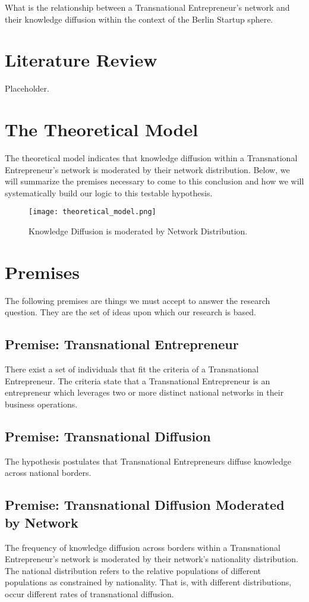 What is the relationship between a Transnational Entrepreneur's
network and their knowledge diffusion within the context of the Berlin
Startup sphere.

\section{Literature Review}
Placeholder.

\section{The Theoretical Model}
The theoretical model indicates that knowledge diffusion within a
Transnational Entrepreneur's network is moderated by their network
distribution. Below, we will summarize the premises necessary to come
to this conclusion and how we will systematically build our logic to
this testable hypothesis.

\begin{figure}[!ht]
  \centering
  \texttt{[image: theoretical\_model.png]}
  \caption{Knowledge Diffusion is moderated by Network Distribution.}
\end{figure}

\section{Premises}
The following premises are things we must accept to answer the
research question. They are the set of ideas upon which our research
is based.

\subsection{Premise: Transnational Entrepreneur}
There exist a set of individuals that fit the criteria of a
Transnational Entrepreneur. The criteria state that a Transnational
Entrepreneur is an entrepreneur which leverages two or more distinct
national networks in their business operations.

\subsection{Premise: Transnational Diffusion}
The hypothesis postulates that Transnational Entrepreneurs diffuse
knowledge across national borders.

\subsection{Premise: Transnational Diffusion Moderated by Network}
The frequency of knowledge diffusion across borders within a
Transnational Entrepreneur's network is moderated by their network's
nationality distribution. The national distribution refers to the
relative populations of different populations as constrained by
nationality. That is, with different distributions, occur different
rates of transnational diffusion.

